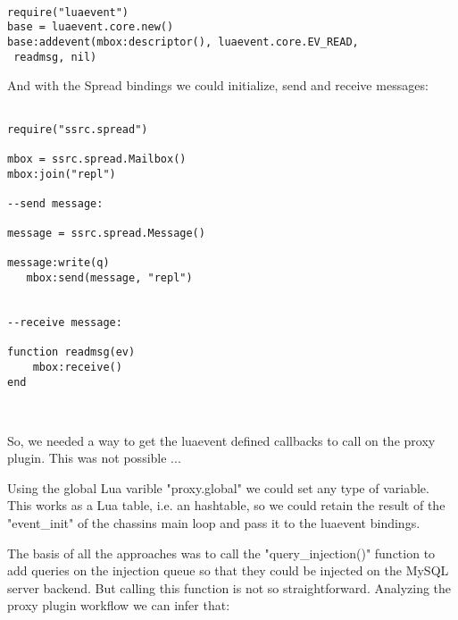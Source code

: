 \begin{lstlisting}

require("luaevent")
base = luaevent.core.new()
base:addevent(mbox:descriptor(), luaevent.core.EV_READ,
 readmsg, nil)

\end{lstlisting}

\vspace{5mm}

And with the Spread bindings we could initialize, send and receive messages:\\

\begin{lstlisting}

require("ssrc.spread")

mbox = ssrc.spread.Mailbox()
mbox:join("repl")

--send message:

message = ssrc.spread.Message()

message:write(q)
   mbox:send(message, "repl")


--receive message:

function readmsg(ev)
	mbox:receive()
end



\end{lstlisting}

So, we needed a way to get the luaevent defined callbacks to call on the proxy plugin. This was not possible  ...

Using the global Lua varible "proxy.global" we could set any type of variable. This works as a Lua table, i.e. an hashtable, so we could retain the result of the "event\_init" of the chassins main loop and pass it to the luaevent bindings.



The basis of all the approaches was to call the "query\_injection()" function to add queries on the injection queue so that they could be injected on the 
MySQL server backend. But calling this function is not so straightforward. Analyzing the proxy plugin workflow we can infer that:

